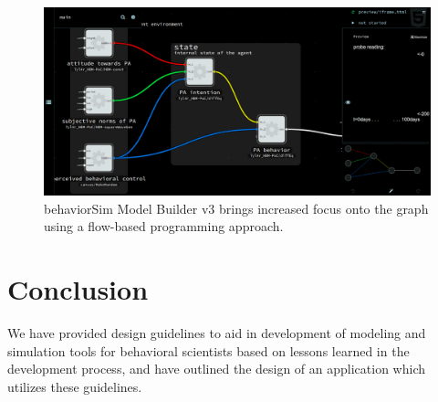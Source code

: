 \documentclass[conference]{IEEEtran}
\begin{document}
\begin{figure}[!t]
  \centering
  \includegraphics[width=0.9\columnwidth]{img/v3}  
  \caption{behaviorSim Model Builder v3 brings increased focus onto the graph using a flow-based programming approach.}
  \label{model-builder-v3}
\end{figure}




\section{Conclusion}
We have provided design guidelines to aid in development of modeling and simulation tools for behavioral scientists based on lessons learned in the development process, and have outlined the design of an application which utilizes these guidelines.



%
%

\end{document}
